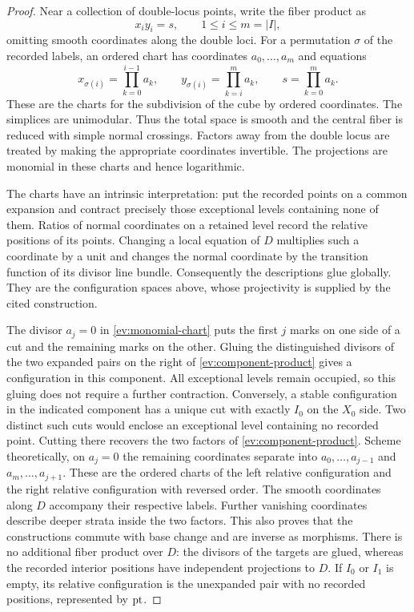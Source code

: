 \begin{proof}
Near a collection of double-locus points, write the fiber product as
\[
  x_i y_i=s,\qquad 1\leq i\leq m=|I|,
\]
omitting smooth coordinates along the double loci.  For a permutation
$\sigma$ of the recorded labels, an ordered chart has coordinates
$a_0,\ldots,a_m$ and equations
\begin{equation}
\label{ev:monomial-chart}
  x_{\sigma(i)}=\prod_{k=0}^{i-1}a_k,
  \qquad
  y_{\sigma(i)}=\prod_{k=i}^{m}a_k,
  \qquad
  s=\prod_{k=0}^{m}a_k.
\end{equation}
These are the charts for the subdivision of the cube by ordered
coordinates.  The simplices are unimodular.  Thus the total space is
smooth and the central fiber is reduced with simple normal crossings.
Factors away from the double locus are treated by making the
appropriate coordinates invertible.  The projections are monomial
in these charts and hence logarithmic.

The charts have an intrinsic interpretation: put the recorded points
on a common expansion and contract precisely those exceptional levels
containing none of them.  Ratios of normal coordinates on a retained
level record the relative positions of its points.  Changing a local
equation of $D$ multiplies such a coordinate by a unit and changes the
normal coordinate by the transition function of its divisor line
bundle.  Consequently the descriptions glue globally.  They are the
configuration spaces above, whose projectivity is supplied by the
cited construction.

The divisor $a_j=0$ in \eqref{ev:monomial-chart} puts the first $j$
marks on one side of a cut and the remaining marks on the other.
Gluing the distinguished divisors of the two expanded pairs on the
right of \eqref{ev:component-product} gives a configuration in this
component.  All exceptional levels remain occupied, so this gluing
does not require a further contraction.  Conversely, a stable
configuration in the indicated component has a unique cut with
exactly $I_0$ on the $X_0$ side.  Two distinct such cuts would enclose
an exceptional level containing no recorded point.  Cutting there
recovers the two factors of \eqref{ev:component-product}.  Scheme
theoretically, on $a_j=0$ the remaining coordinates separate into
$a_0,\ldots,a_{j-1}$ and $a_m,\ldots,a_{j+1}$.  These are the
ordered charts of the left relative configuration and the right
relative configuration with reversed order.  The smooth coordinates
along $D$ accompany their respective labels.  Further vanishing
coordinates describe deeper strata inside the two factors.  This
also proves that the constructions commute with base change and
are inverse as morphisms.  There is no additional fiber product over
$D$: the divisors of the targets are glued, whereas the recorded
interior positions have independent projections to $D$.
If $I_0$ or $I_1$ is empty, its relative configuration is the
unexpanded pair with no recorded positions, represented by $\mathrm{pt}$.


\end{proof}
